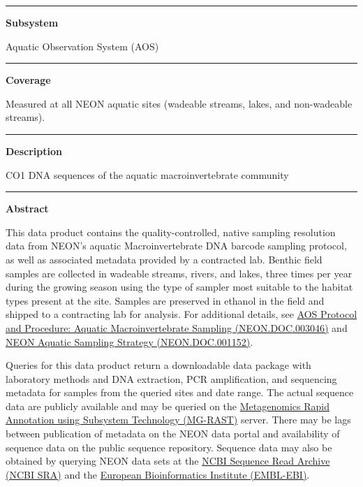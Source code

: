 \documentclass[]{article}
\begin{document}
\begin{center}\rule{0.5\linewidth}{\linethickness}\end{center}

\textbf{Subsystem}

Aquatic Observation System (AOS)

\begin{center}\rule{0.5\linewidth}{\linethickness}\end{center}

\textbf{Coverage}

Measured at all NEON aquatic sites (wadeable streams, lakes, and
non-wadeable streams).

\begin{center}\rule{0.5\linewidth}{\linethickness}\end{center}

\textbf{Description}

CO1 DNA sequences of the aquatic macroinvertebrate community

\begin{center}\rule{0.5\linewidth}{\linethickness}\end{center}

\textbf{Abstract}

This data product contains the quality-controlled, native sampling
resolution data from NEON's aquatic Macroinvertebrate DNA barcode
sampling protocol, as well as associated metadata provided by a
contracted lab. Benthic field samples are collected in wadeable streams,
rivers, and lakes, three times per year during the growing season using
the type of sampler most suitable to the habitat types present at the
site. Samples are preserved in ethanol in the field and shipped to a
contracting lab for analysis. For additional details, see
\href{http://data.neonscience.org/api/v0/documents/NEON.DOC.003046vC}{AOS
Protocol and Procedure: Aquatic Macroinvertebrate Sampling
(NEON.DOC.003046)} and
\href{http://data.neonscience.org/api/v0/documents/NEON.DOC.001152vA}{NEON
Aquatic Sampling Strategy (NEON.DOC.001152)}.

Queries for this data product return a downloadable data package with
laboratory methods and DNA extraction, PCR amplification, and sequencing
metadata for samples from the queried sites and date range. The actual
sequence data are publicly available and may be queried on the
\href{http://metagenomics.anl.gov/}{Metagenomics Rapid Annotation using
Subsystem Technology (MG-RAST)} server. There may be lags between
publication of metadata on the NEON data portal and availability of
sequence data on the public sequence repository. Sequence data may also
be obtained by querying NEON data sets at the
\href{https://www.ncbi.nlm.nih.gov/sra}{NCBI Sequence Read Archive (NCBI
SRA)} and the \href{https://www.ebi.ac.uk/}{European Bioinformatics
Institute (EMBL-EBI)}.
\end{document}
